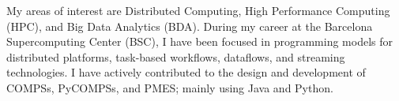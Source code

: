 %
%
%

\par{
My areas of interest are Distributed Computing, High Performance Computing (HPC), and Big Data Analytics (BDA). During my career at the Barcelona Supercomputing Center (BSC), I have been focused in programming models for distributed platforms, task-based workflows, dataflows, and streaming technologies. I have actively contributed to the design and development of COMPSs, PyCOMPSs, and PMES; mainly using Java and Python.
}

\vspace{0.5em}